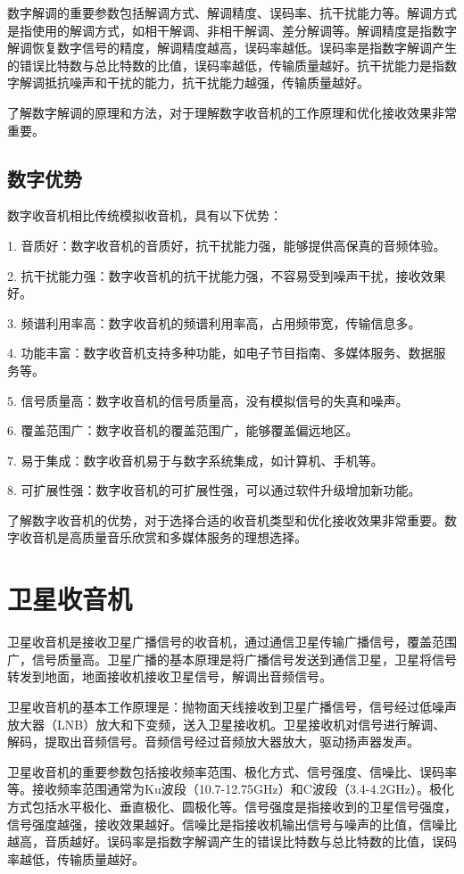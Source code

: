 \documentclass[12pt,UTF8]{ctexbook}
\begin{document}
数字解调的重要参数包括解调方式、解调精度、误码率、抗干扰能力等。解调方式是指使用的解调方式，如相干解调、非相干解调、差分解调等。解调精度是指数字解调恢复数字信号的精度，解调精度越高，误码率越低。误码率是指数字解调产生的错误比特数与总比特数的比值，误码率越低，传输质量越好。抗干扰能力是指数字解调抵抗噪声和干扰的能力，抗干扰能力越强，传输质量越好。

了解数字解调的原理和方法，对于理解数字收音机的工作原理和优化接收效果非常重要。

\subsection{数字优势}

数字收音机相比传统模拟收音机，具有以下优势：

1. 音质好：数字收音机的音质好，抗干扰能力强，能够提供高保真的音频体验。

2. 抗干扰能力强：数字收音机的抗干扰能力强，不容易受到噪声干扰，接收效果好。

3. 频谱利用率高：数字收音机的频谱利用率高，占用频带宽，传输信息多。

4. 功能丰富：数字收音机支持多种功能，如电子节目指南、多媒体服务、数据服务等。

5. 信号质量高：数字收音机的信号质量高，没有模拟信号的失真和噪声。

6. 覆盖范围广：数字收音机的覆盖范围广，能够覆盖偏远地区。

7. 易于集成：数字收音机易于与数字系统集成，如计算机、手机等。

8. 可扩展性强：数字收音机的可扩展性强，可以通过软件升级增加新功能。

了解数字收音机的优势，对于选择合适的收音机类型和优化接收效果非常重要。数字收音机是高质量音乐欣赏和多媒体服务的理想选择。

\section{卫星收音机}

卫星收音机是接收卫星广播信号的收音机，通过通信卫星传输广播信号，覆盖范围广，信号质量高。卫星广播的基本原理是将广播信号发送到通信卫星，卫星将信号转发到地面，地面接收机接收卫星信号，解调出音频信号。

卫星收音机的基本工作原理是：抛物面天线接收到卫星广播信号，信号经过低噪声放大器（LNB）放大和下变频，送入卫星接收机。卫星接收机对信号进行解调、解码，提取出音频信号。音频信号经过音频放大器放大，驱动扬声器发声。

卫星收音机的重要参数包括接收频率范围、极化方式、信号强度、信噪比、误码率等。接收频率范围通常为Ku波段（10.7-12.75GHz）和C波段（3.4-4.2GHz）。极化方式包括水平极化、垂直极化、圆极化等。信号强度是指接收到的卫星信号强度，信号强度越强，接收效果越好。信噪比是指接收机输出信号与噪声的比值，信噪比越高，音质越好。误码率是指数字解调产生的错误比特数与总比特数的比值，误码率越低，传输质量越好。
\end{document}
